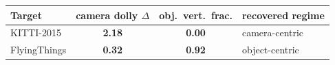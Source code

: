 \begin{tabular}{l cc l}
\toprule
Target & camera dolly $\Delta$ & obj.\ vert.\ frac. & recovered regime \\
\midrule
KITTI-2015 & \textbf{2.18} & \textbf{0.00} & camera-centric \\
FlyingThings & \textbf{0.32} & \textbf{0.92} & object-centric \\
\bottomrule
\end{tabular}
